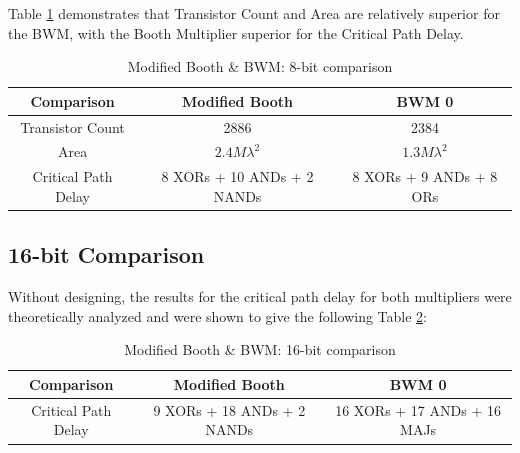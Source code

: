 \documentclass[journal]{IEEEtran}
\begin{document}
Table \ref{tab:t8} demonstrates that Transistor Count and Area are relatively superior for the BWM, with the Booth Multiplier superior for the Critical Path Delay.

\begin{table}[!h]
\renewcommand{\arraystretch}{1.2}
\caption{Modified Booth \& BWM: 8-bit comparison}
\label{tab:t8}
\centering
\begin{tabular}{| c | c | c | }
\hline
\textbf{Comparison} & \textbf{Modified Booth} & 
\textbf{BWM} 0\\\hline
Transistor Count & 2886 & 2384\\\hline
Area & $2.4 M \lambda^2$ & $1.3 M \lambda^2$\\\hline
Critical Path Delay & 8 XORs + 10 ANDs + 2 NANDs 
& 8 XORs + 9 ANDs + 8 ORs\\\hline
\end{tabular}
\end{table}


\subsection{16-bit Comparison}

Without designing, the results for the critical path delay for both multipliers were theoretically analyzed and were shown to give the following Table \ref{tab:t9}:

\begin{table}[!h]
\renewcommand{\arraystretch}{1.2}
\caption{Modified Booth \& BWM: 16-bit comparison}
\label{tab:t9}
\centering
\begin{tabular}{| c | c | c | }
\hline
\textbf{Comparison} & \textbf{Modified Booth} & 
\textbf{BWM} 0\\\hline
Critical Path Delay & 9 XORs + 18 ANDs + 2 NANDs 
& 16 XORs + 17 ANDs + 16 MAJs\\\hline
\end{tabular}
\end{table}
\end{document}
